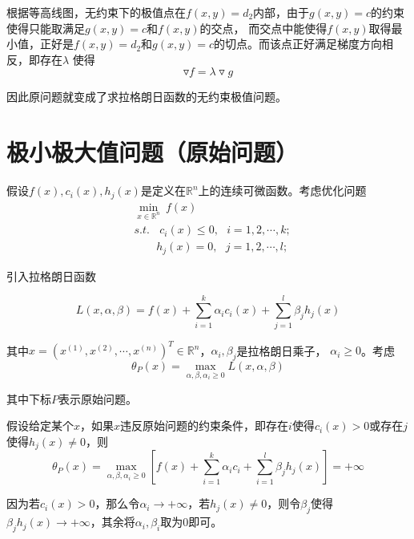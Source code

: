根据等高线图，无约束下的极值点在$f(x,y)=d_2$内部，由于$g(x,y)=c$的约束使得只能取满足$g(x,y)=c$和$f(x,y)$的交点，
而交点中能使得$f(x,y)$取得最小值，正好是$f(x,y)=d_2$和$g(x,y)=c$的切点。而该点正好满足梯度方向相反，即存在$\lambda$
使得
\begin{equation}
    \triangledown f=\lambda\triangledown g
\end{equation}

因此原问题就变成了求拉格朗日函数的无约束极值问题。


\section{极小极大值问题（原始问题）}

假设$f(x),c_i(x),h_j(x)$是定义在$\mathbb{R}^n$上的连续可微函数。考虑优化问题
\begin{equation}
    \begin{aligned}
        & \min\limits_{x\in \mathbb{R}^n}\ f(x)\\
        & s.t. \ \ \ \ c_i(x)\leqslant 0,\ \ \ i=1,2,\cdots,k;\\
        &\ \ \ \ \ \ \ \  \ h_j(x)=0,\ \ \ j=1,2,\cdots,l;
    \end{aligned}
\end{equation}

引入拉格朗日函数

\begin{equation}
    L(x,\alpha,\beta)=f(x)+\sum\limits_{i=1}^{k}\alpha_ic_i(x)+\sum\limits_{j=1}^{l}\beta_jh_j(x)
\end{equation}

其中$x=(x^{(1)},x^{(2)},\cdots,x^{(n)})^T\in \mathbb{R}^n$，$\alpha_i,\beta_j$是拉格朗日乘子，
$\alpha_i\geqslant 0$。考虑
\begin{equation}
    \theta_P(x)=\max\limits_{\alpha,\beta,\alpha_i\geqslant 0} L(x,\alpha,\beta)
\end{equation}

其中下标$P$表示原始问题。

假设给定某个$x$，如果$x$违反原始问题的约束条件，即存在$i$使得$c_i(x)>0$或存在$j$使得$h_j(x)\neq 0$，则
\begin{equation}
    \theta_P(x)=\max\limits_{\alpha,\beta,\alpha_i\geqslant 0}
    [f(x)+\sum\limits_{i=1}^{k}\alpha_ic_i+\sum\limits_{i=1}^{l}\beta_jh_j(x)]=+\infty
\end{equation}

因为若$c_i(x)>0$，那么令$\alpha_i\rightarrow +\infty$，若$h_j(x)\neq 0$，则令$\beta_j$使得
$\beta_jh_j(x)\rightarrow +\infty$，其余将$\alpha_i,\beta_i$取为0即可。

